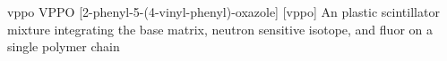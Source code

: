 \newglsXchemical%
{vppo}%
{VPPO}%
[2-phenyl-5-(4-vinyl-phenyl)-oxazole]%
{}%
[vppo]%
{An plastic scintillator mixture integrating the base matrix, neutron sensitive isotope, and fluor on a single polymer chain}%